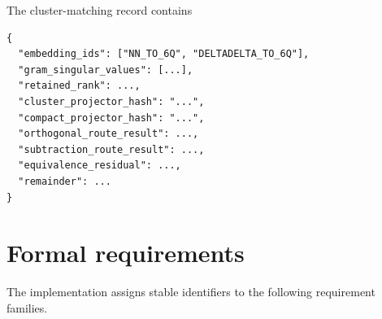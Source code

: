 \documentclass[11pt]{article}
\begin{document}
The cluster-matching record contains
\begin{verbatim}
{
  "embedding_ids": ["NN_TO_6Q", "DELTADELTA_TO_6Q"],
  "gram_singular_values": [...],
  "retained_rank": ...,
  "cluster_projector_hash": "...",
  "compact_projector_hash": "...",
  "orthogonal_route_result": ...,
  "subtraction_route_result": ...,
  "equivalence_residual": ...,
  "remainder": ...
}
\end{verbatim}

\section{Formal requirements}
\label{sec:requirements}

The implementation assigns stable identifiers to the following requirement families.
\end{document}
